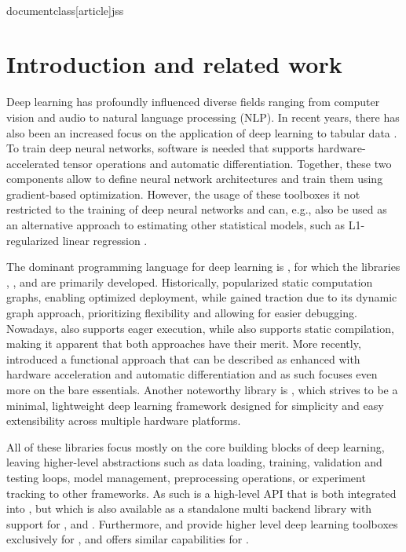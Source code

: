 \\documentclass[article]{jss}
\theoremstyle{definition}
\begin{document}
\section{Introduction and related work}

Deep learning has profoundly influenced diverse fields ranging from computer vision and audio to natural language processing (NLP).
In recent years, there has also been an increased focus on the application of deep learning to tabular data \citep{ref-borisov2022deep}.
To train deep neural networks, software is needed that supports hardware-accelerated tensor operations and automatic differentiation.
Together, these two components allow to define neural network architectures and train them using gradient-based optimization.
However, the usage of these toolboxes it not restricted to the training of deep neural networks and can, e.g., also be used as an alternative approach to estimating other statistical models, such as L1-regularized linear regression \citep{ref-kolb2025deep}.

The dominant programming language for deep learning is  \citep{ref-van1995python}, for which the libraries  \citep{ref-abadi2016tensorflow},  \citep{ref-pytorch}, and  \citep{ref-jax2018github} are primarily developed.
Historically,  popularized static computation graphs, enabling optimized deployment, while  gained traction due to its dynamic graph approach, prioritizing flexibility and allowing for easier debugging.
Nowadays,  also supports eager execution, while  also supports static compilation, making it apparent that both approaches have their merit.
More recently,  introduced a functional approach that can be described as  \citep{ref-harris2020array} enhanced with hardware acceleration and automatic differentiation and as such focuses even more on the bare essentials.
Another noteworthy library is  \citep{ref-tinygrad}, which strives to be a minimal, lightweight deep learning framework designed for simplicity and easy extensibility across multiple hardware platforms.

All of these libraries focus mostly on the core building blocks of deep learning, leaving higher-level abstractions such as data loading, training, validation and testing loops, model management, preprocessing operations, or experiment tracking to other frameworks.
As such  \citep{chollet2018keras} is a high-level API that is both integrated into , but which is also available as a standalone multi backend library with support for ,  and . Furthermore,  \citep{ref-lightning2019} and  provide higher level deep learning toolboxes exclusively for , and  \citep{ref-trax} offers similar capabilities for .
\end{document}

